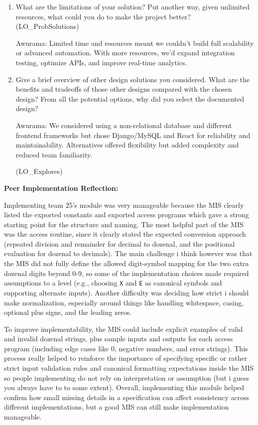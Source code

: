 \documentclass[12pt, titlepage]{article}
\begin{document}
\begin{itemize}
\begin{enumerate}
  Awurama: We refined sections of the SRS and MG for consistency,
  mainly updating module responsibilities and interfaces to match the finalized MIS content.

  \item What are the limitations of your solution?  Put another way, given
  unlimited resources, what could you do to make the project better? (LO\_ProbSolutions)

  Awurama: Limited time and resources meant we couldn’t build full scalability or advanced automation.
  With more resources, we’d expand integration testing, optimize APIs, and improve real-time analytics.

  \item Give a brief overview of other design solutions you considered.  What
  are the benefits and tradeoffs of those other designs compared with the chosen
  design?  From all the potential options, why did you select the documented design?

  Awurama: We considered using a non-relational database and different frontend frameworks but chose Django/MySQL and React
  for reliability and maintainability. Alternatives offered flexibility but added complexity and reduced team familiarity.

  (LO\_Explores)
\end{enumerate}

\textbf{Peer Implementation Reflection:}

  Implementing team 25's module was very manageable because the MIS clearly listed the exported constants and exported access
  programs which gave a strong starting point for the structure and naming. The most helpful part of the MIS was the access routine,
  since it clearly stated the expected conversion approach (repeated division and remainder for decimal to dozenal,
  and the positional evaluation for dozenal to decimals). The main challenge i think however was that the MIS did not fully define the allowed
  digit-symbol mapping for the two extra dozenal digits beyond 0-9, so some of the implementation choices made required assumptions
  to a level (e.g., choosing \texttt{X} and \texttt{E} as canonical symbols and supporting alternate inputs).
  Another difficulty was deciding how strict i should make normalization, especially around things like handling whitespace, casing, optional
  plus signs, and the leading zeros.

  To improve implementability, the MIS could include explicit examples of valid and invalid dozenal
  strings, plus sample inputs and outputs for each access program (including edge cases like 0, negative numbers, and error
  strings). This process really helped to reinforce the importance of specifying specific or rather strict input validation rules and canonical formatting
  expectations inside the MIS so people implementing do not rely on interpretation or assumption (but i guess you always have to to some extent).
  Overall, implementing this module helped confirm
  how small missing details in a specification can affect consistency across different implementations, but a good MIS can still make implementation manageable.


\end{itemize}
\end{document}
